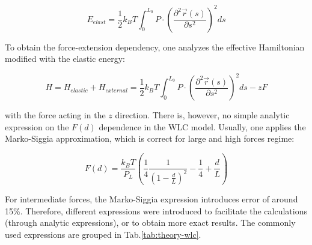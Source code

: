 \begin{equation}
    \boxed{E_{elast}={\frac {1}{2}}k_{B}T\int _{0}^{L_{0}}P\cdot \left({\frac {\partial ^{2}{\vec {r}}(s)}{\partial s^{2}}}\right)^{2}ds}
    \label{eq:wlc-hamiltonian}
\end{equation}

To obtain the force-extension dependency, one analyzes the effective Hamiltonian modified with the elastic energy:

\begin{equation}
    H=H_{elastic}+H_{external}={\frac {1}{2}}k_{B}T\int _{0}^{L_{0}}P\cdot \left({\frac {\partial ^{2}{\vec {r}}(s)}{\partial s^{2}}}\right)^{2}ds - zF
    \label{eq:wlc-effective-hamiltonian}
\end{equation}

with the force acting in the $z$ direction.
There is, however, no simple analytic expression on the $F(d)$ dependence in the WLC model.
Usually, one applies the Marko-Siggia approximation\cite{marko1995statistical}, which is correct for large and high forces regime:

\begin{equation}
    \boxed{F(d)=\frac{k_{B}T}{P_L}\left({\frac {1}{4}}\frac{1}{(1-{\frac {d}{L}})^{2}}-{\frac {1}{4}}+{\frac {d}{L}}\right)}
    \label{eq:marko-siggia}
\end{equation}

For intermediate forces, the Marko-Siggia expression introduces error of around 15\%\cite{petrosyan2017improved}.
Therefore, different expressions were introduced to facilitate the calculations (through analytic expressions), or to obtain more exact results.
The commonly used expressions are grouped in Tab.\ref{tab:theory-wlc}.

